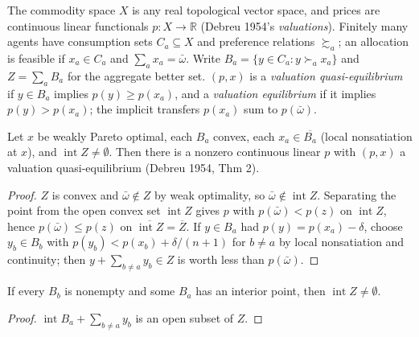 The commodity space $X$ is any real topological vector space, and prices are continuous linear functionals
$p : X \to \mathbb{R}$ (Debreu 1954's \emph{valuations}). Finitely many agents have consumption sets $C_a \subseteq X$
and preference relations $\succsim_a$; an allocation is feasible if $x_a \in C_a$ and $\sum_a x_a = \bar\omega$.
Write $B_a = \{y \in C_a : y \succ_a x_a\}$ and $Z = \sum_a B_a$ for the aggregate better set. $(p, x)$ is a
\emph{valuation quasi-equilibrium} if $y \in B_a$ implies $p(y) \ge p(x_a)$, and a \emph{valuation equilibrium} if
it implies $p(y) > p(x_a)$; the implicit transfers $p(x_a)$ sum to $p(\bar\omega)$.

\begin{theorem}
\label{thm:swt_tvs}
\leanok
Let $x$ be weakly Pareto optimal, each $B_a$ convex, each $x_a \in \overline{B_a}$ (local nonsatiation at $x$), and
$\operatorname{int} Z \neq \emptyset$. Then there is a nonzero continuous linear $p$ with $(p, x)$ a valuation
quasi-equilibrium (Debreu 1954, Thm 2).
\end{theorem}
\begin{proof}
\leanok
$Z$ is convex and $\bar\omega \notin Z$ by weak optimality, so $\bar\omega \notin \operatorname{int} Z$. Separating the
point from the open convex set $\operatorname{int} Z$ gives $p$ with $p(\bar\omega) < p(z)$ on $\operatorname{int} Z$,
hence $p(\bar\omega) \le p(z)$ on $\overline{\operatorname{int} Z} = \overline{Z}$. If $y \in B_a$ had
$p(y) = p(x_a) - \delta$, choose $y_b \in B_b$ with $p(y_b) < p(x_b) + \delta/(n+1)$ for $b \ne a$ by local
nonsatiation and continuity; then $y + \sum_{b \ne a} y_b \in Z$ is worth less than $p(\bar\omega)$.
\end{proof}

\begin{lemma}
\label{lem:aggbetter_interior}
\leanok
{}
If every $B_b$ is nonempty and some $B_a$ has an interior point, then $\operatorname{int} Z \ne \emptyset$.
\end{lemma}
\begin{proof}
\leanok
$\operatorname{int} B_a + \sum_{b \ne a} y_b$ is an open subset of $Z$.
\end{proof}


